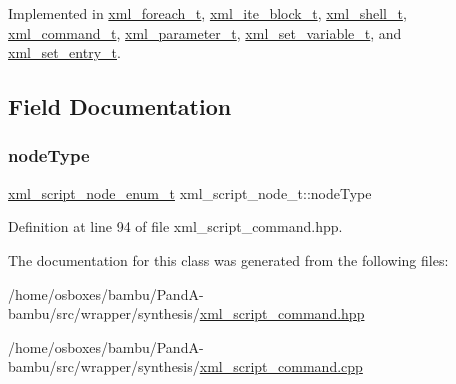 Implemented in \hyperlink{structxml__foreach__t_ad1bf3053ce2cc69b9b6a02402b7f9c22}{xml\+\_\+foreach\+\_\+t}, \hyperlink{classxml__ite__block__t_a82a199264ab67116550596a27ff2b051}{xml\+\_\+ite\+\_\+block\+\_\+t}, \hyperlink{classxml__shell__t_a5a9787981f0f16d4182a21cca3b14916}{xml\+\_\+shell\+\_\+t}, \hyperlink{classxml__command__t_a5d5ebe5a97c62b313c7190bb084fba87}{xml\+\_\+command\+\_\+t}, \hyperlink{classxml__parameter__t_a22e2fc519a78dbadd7dd583a5e6a5556}{xml\+\_\+parameter\+\_\+t}, \hyperlink{classxml__set__variable__t_aa247f1465847c3ee2ec8f7200e2ac401}{xml\+\_\+set\+\_\+variable\+\_\+t}, and \hyperlink{classxml__set__entry__t_a0a526ef7f3872e92b59a6f961b3383cf}{xml\+\_\+set\+\_\+entry\+\_\+t}.



\subsection{Field Documentation}
\mbox{\label{classxml__script__node__t_aaf981f64fd03ed4d8afbacd9f1cdbe2c}} 
\subsubsection{\texorpdfstring{node\+Type}{nodeType}}
{\footnotesize\ttfamily \hyperlink{xml__script__command_8hpp_a3f764b80e60a34ae77719e7f4616a59b}{xml\+\_\+script\+\_\+node\+\_\+enum\+\_\+t} xml\+\_\+script\+\_\+node\+\_\+t\+::node\+Type}



Definition at line 94 of file xml\+\_\+script\+\_\+command.\+hpp.



The documentation for this class was generated from the following files\+:\begin{DoxyCompactItemize}
\item 
/home/osboxes/bambu/\+Pand\+A-\/bambu/src/wrapper/synthesis/\hyperlink{xml__script__command_8hpp}{xml\+\_\+script\+\_\+command.\+hpp}\item 
/home/osboxes/bambu/\+Pand\+A-\/bambu/src/wrapper/synthesis/\hyperlink{xml__script__command_8cpp}{xml\+\_\+script\+\_\+command.\+cpp}\end{DoxyCompactItemize}

